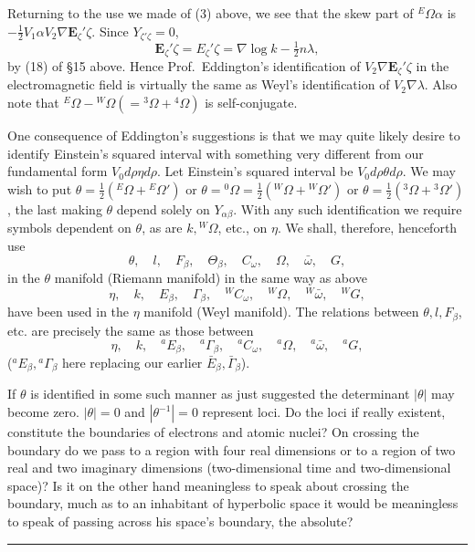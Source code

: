 \documentclass[11pt]{article}
\begin{document}
\indent Returning to the use we made of (3) above, we see that the skew part of ${}^E\Omega\alpha$ is $-\tfrac12V_1\alpha V_2\nabla\mathbf{E}_\zeta'\zeta$. Since $Y_{\zeta'\zeta}=0$,
\begin{equation}\mathbf{E}_\zeta'\zeta=E_\zeta'\zeta=\nabla\log k-\tfrac12n\lambda,\tag{15}\end{equation}
by (18) of \S15 above. Hence Prof.\ Eddington's identification of $V_2\nabla\mathbf{E}_\zeta'\zeta$ in the electromagnetic field is virtually the same as Weyl's identification of $V_2\nabla\lambda$. Also note that ${}^E\Omega-{}^W\Omega(={}^3\Omega+{}^4\Omega)$ is self-conjugate.

\indent One consequence of Eddington's suggestions is that we may quite likely desire to identify Einstein's squared interval with something very different from our fundamental form $V_0d\rho\eta d\rho$. Let Einstein's squared interval be $V_0d\rho\theta d\rho$. We may wish to put $\theta=\tfrac12({}^E\Omega+{}^E\Omega')$ or $\theta={}^0\Omega=\tfrac12({}^W\Omega+{}^W\Omega')$ or $\theta=\tfrac12({}^3\Omega+{}^3\Omega')$, the last making $\theta$ depend solely on $Y_{\alpha\beta}$. With any such identification we require symbols dependent on $\theta$, as are $k,{}^W\Omega$, etc., on $\eta$. We shall, therefore, henceforth use
\[
\theta,\quad l,\quad F_\beta,\quad \Theta_\beta,\quad C_\omega,\quad \Omega,\quad \bar\omega,\quad G,
\]
in the $\theta$ manifold (Riemann manifold) in the same way as above
\[
\eta,\quad k,\quad E_\beta,\quad \Gamma_\beta,\quad {}^W C_\omega,\quad {}^W\Omega,\quad {}^W\bar\omega,\quad {}^W G,
\]
have been used in the $\eta$ manifold (Weyl manifold). The relations between $\theta,l,F_\beta$, etc. are precisely the same as those between
\[
\eta,\quad k,\quad {}^aE_\beta,\quad {}^a\Gamma_\beta,\quad {}^aC_\omega,\quad {}^a\Omega,\quad {}^a\bar\omega,\quad {}^aG,
\]
(${}^aE_\beta,{}^a\Gamma_\beta$ here replacing our earlier $\bar E_\beta,\bar\Gamma_\beta$).

\indent If $\theta$ is identified in some such manner as just suggested the determinant $|\theta|$ may become zero. $|\theta|=0$ and $|\theta^{-1}|=0$ represent loci. Do the loci if really existent, constitute the boundaries of electrons and atomic nuclei? On crossing the boundary do we pass to a region with four real dimensions or to a region of two real and two imaginary dimensions (two-dimensional time and two-dimensional space)? Is it on the other hand meaningless to speak about crossing the boundary, much as to an inhabitant of hyperbolic space it would be meaningless to speak of passing across his space's boundary, the absolute?

\begin{center}\rule{2.5in}{0.4pt}\end{center}
\end{document}

